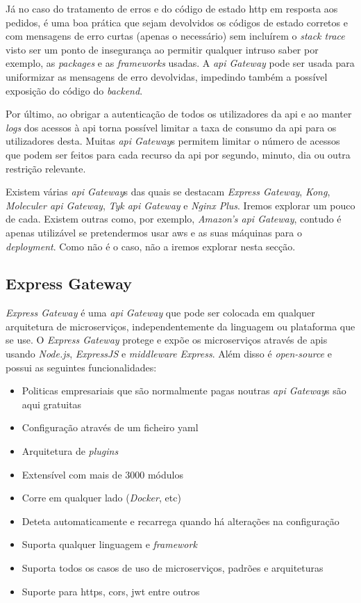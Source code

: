 Já no caso do tratamento de erros e do código de estado \acrshort{http} em resposta aos pedidos, é uma boa prática que sejam devolvidos os códigos de estado corretos e com mensagens de erro curtas (apenas o necessário) sem incluírem o \textit{stack trace} visto ser um ponto de insegurança ao permitir qualquer intruso saber por exemplo, as \textit{packages} e as \textit{frameworks} usadas. A \textit{\acrshort{api} Gateway} pode ser usada para uniformizar as mensagens de erro devolvidas, impedindo também a possível exposição do código do \textit{backend}.

Por último, ao obrigar a autenticação de todos os utilizadores da \acrshort{api} e ao manter \textit{logs} dos acessos à \acrshort{api} torna possível limitar a taxa de consumo da \acrshort{api} para os utilizadores desta. Muitas \textit{\acrshort{api} Gateway}s permitem limitar o número de acessos que podem ser feitos para cada recurso da \acrshort{api} por segundo, minuto, dia ou outra restrição relevante.

Existem várias \textit{\acrshort{api} Gateway}s das quais se destacam \textit{Express Gateway}, \textit{Kong}, \textit{Moleculer \acrshort{api} Gateway}, \textit{Tyk \acrshort{api} Gateway} e \textit{Nginx Plus}. Iremos explorar um pouco de cada. Existem outras como, por exemplo, \textit{Amazon's \acrshort{api} Gateway}, contudo é apenas utilizável se pretendermos usar \acrshort{aws} e as suas máquinas para o \textit{deployment}. Como não é o caso, não a iremos explorar nesta secção.

\subsection{Express Gateway}

\textit{Express Gateway} é uma \textit{\acrshort{api} Gateway} que pode ser colocada em qualquer arquitetura de microserviços, independentemente da linguagem ou plataforma que se use. O \textit{Express Gateway} protege e expõe os microserviços através de \acrshort{api}s usando \textit{Node.js}, \textit{ExpressJS} e \textit{middleware} \textit{Express}. Além disso é \textit{open-source} e possui as seguintes funcionalidades:~\cite{kong}
\begin{itemize}
    \item Politicas empresariais que são normalmente pagas noutras \textit{\acrshort{api} Gateway}s são aqui gratuitas
    \item Configuração através de um ficheiro \acrshort{yaml}
    \item Arquitetura de \textit{plugins}
    \item Extensível com mais de 3000 módulos
    \item Corre em qualquer lado (\textit{Docker}, etc)
    \item Deteta automaticamente e recarrega quando há alterações na configuração
    \item Suporta qualquer linguagem e \textit{framework}
    \item Suporta todos os casos de uso de microserviços, padrões e arquiteturas
    \item Suporte para \acrshort{https}, \acrshort{cors}, \acrshort{jwt} entre outros
\end{itemize}

